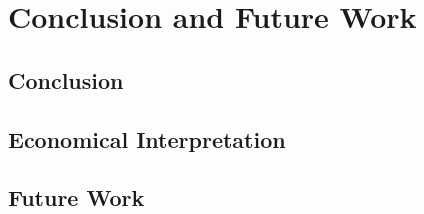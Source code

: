 \chapter{Conclusion and Future Work}
\label{chap:conclusion}
\section{Conclusion}
\section{Economical Interpretation}
\section{Future Work}

